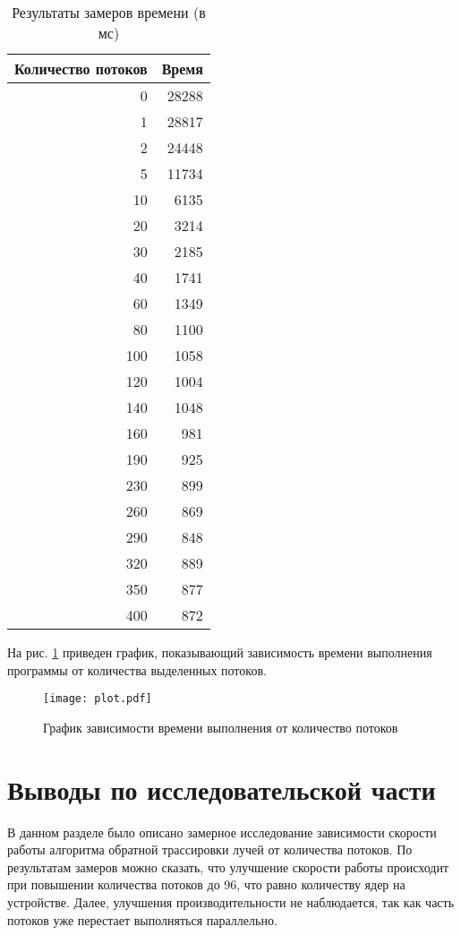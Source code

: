 \begin{table}[h!]
  \caption{\label{table:speed} Результаты замеров времени (в мс)}
  \begin{center}
    \begin{tabular}{|r|r|}
      \hline
      Количество потоков & Время\\ \hline
		0 & 28288 \\ \hline
		1 & 28817 \\ \hline
		2 & 24448 \\ \hline
		5 & 11734 \\ \hline
		10 & 6135 \\ \hline
		20 & 3214 \\ \hline
		30 & 2185 \\ \hline
		40 & 1741 \\ \hline
		60 & 1349 \\ \hline
		80 & 1100 \\ \hline
		100 & 1058 \\ \hline
		120 & 1004 \\ \hline
		140 & 1048 \\ \hline
		160 & 981 \\ \hline
		190 & 925 \\ \hline
		230 & 899 \\ \hline
		260 & 869 \\ \hline
		290 & 848 \\ \hline
		320 & 889 \\ \hline
		350 & 877 \\ \hline
		400 & 872 \\ \hline
    \end{tabular}
  \end{center}
\end{table}

\newpage

На рис. \ref{img:plot} приведен график, показывающий зависимость времени выполнения программы от количества выделенных потоков.

\begin{figure}[h!]
	\centering
    \texttt{[image: plot.pdf]}
    \caption{График зависимости времени выполнения от количество потоков}
    \label{img:plot}
\end{figure}

\section{Выводы по исследовательской части}
В данном разделе было описано замерное исследование зависимости скорости работы алгоритма обратной трассировки лучей от количества потоков. По результатам замеров можно сказать, что улучшение скорости работы происходит при повышении количества потоков до 96, что равно количеству ядер на устройстве. Далее, улучшения производительности не наблюдается, так как часть потоков уже перестает выполняться параллельно.

\newpage